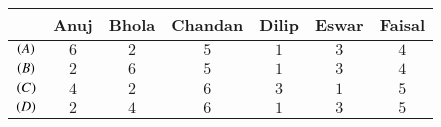 \begin{tabular}[12pt]{ |c|c|c|c|c|c|c|}
\hline
 &Anuj & Bhola & Chandan & Dilip & Eswar & Faisal\\ 
\hline
$\left(A\right)$ & $6$ & $2$ & $5$ & $1$ & $3$ & $4$\\
\hline
$\left(B\right)$ & $2$ & $6$ & $5$ & $1$ & $3$ & $4$\\
\hline
$\left(C\right)$ & $4$ & $2$ & $6$ & $3$ & $1$ & $5$\\
\hline
$\left(D\right)$ & $2$ & $4$ & $6$ & $1$ & $3$ & $5$\\
\hline
\end{tabular}\\
